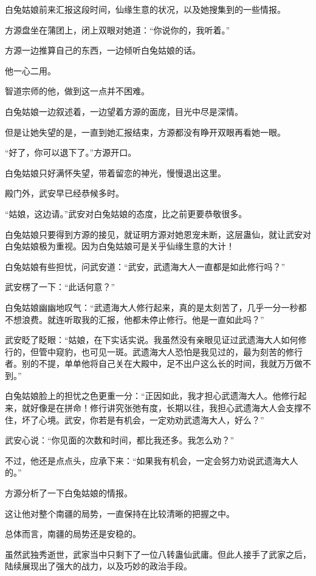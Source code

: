 \begin{this_body}
白兔姑娘前来汇报这段时间，仙缘生意的状况，以及她搜集到的一些情报。

方源盘坐在蒲团上，闭上双眼对她道：“你说你的，我听着。”

方源一边推算自己的东西，一边倾听白兔姑娘的话。

他一心二用。

智道宗师的他，做到这一点并不困难。

白兔姑娘一边叙述着，一边望着方源的面庞，目光中尽是深情。

但是让她失望的是，一直到她汇报结束，方源都没有睁开双眼再看她一眼。

“好了，你可以退下了。”方源开口。

白兔姑娘只好满怀失望，带着留恋的神光，慢慢退出这里。

殿门外，武安早已经恭候多时。

“姑娘，这边请。”武安对白兔姑娘的态度，比之前更要恭敬很多。

白兔姑娘只要得到方源的接见，就证明方源对她恩宠未断，这层蛊仙，就让武安对白兔姑娘极为重视。因为白兔姑娘可是关乎仙缘生意的大计！

白兔姑娘有些担忧，问武安道：“武安，武遗海大人一直都是如此修行吗？”

武安楞了一下：“此话何意？”

白兔姑娘幽幽地叹气：“武遗海大人修行起来，真的是太刻苦了，几乎一分一秒都不想浪费。就连听取我的汇报，他都未停止修行。他是一直如此吗？”

武安眨了眨眼：“姑娘，在下实话实说。我虽然没有亲眼见证过武遗海大人如何修行的，但管中窥豹，也可见一斑。武遗海大人恐怕是我见过的，最为刻苦的修行者。别的不提，单单他将自己关在大殿中，足不出户这么长的时间，我就万万做不到。”

白兔姑娘脸上的担忧之色更重一分：“正因如此，我才担心武遗海大人。他修行起来，就好像是在拼命！修行讲究张弛有度，长期以往，我担心武遗海大人会支撑不住，坏了心境。武安，你若是有机会，一定劝劝武遗海大人，好么？”

武安心说：“你见面的次数和时间，都比我还多。我怎么劝？”

不过，他还是点点头，应承下来：“如果我有机会，一定会努力劝说武遗海大人的。”

方源分析了一下白兔姑娘的情报。

这让他对整个南疆的局势，一直保持在比较清晰的把握之中。

总体而言，南疆的局势还是安稳的。

虽然武独秀逝世，武家当中只剩下了一位八转蛊仙武庸。但此人接手了武家之后，陆续展现出了强大的战力，以及巧妙的政治手段。


\end{this_body}
